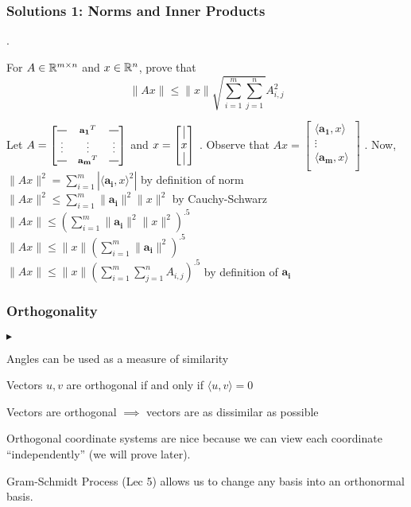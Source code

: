 \documentclass{beamer}
\renewenvironment{itemize}
\newcommand*{\horzbar}{\rule[.5ex]{2.5ex}{0.5pt}}
\newcommand\fonteight{\fontsize{8}{9.6}\selectfont}
\renewenvironment{enumerate}%
{\begin{list}{\arabic{enumi}.}%
      {\setlength{\leftmargin}{2.5em}%
       \setlength{\itemsep}{-\parsep}%
       \setlength{\topsep}{-\parskip}%
       \usecounter{enumi}}%
 }{\end{list}}
\renewenvironment{itemize}%
{\begin{list}{$\blacktriangleright$}%
      {\setlength{\leftmargin}{2.5em}%
       \setlength{\itemsep}{-\parsep}%
       \setlength{\topsep}{-\parskip}%
       \usecounter{enumi}}%
 }{\end{list}}
\begin{document}
\begin{frame}
\frametitle{Solutions 1: Norms and Inner Products}

\begin{enumerate}
\item[2.] For $A \in \mathbb{R}^{m\times n}$ and $x\in \mathbb{R}^n$, prove that
$$ \|Ax\| \leq \|x\|\sqrt{\sum_{i=1}^m \sum_{j=1}^n} A_{i,j}^2$$
\begin{solution}
Let $A = {\fonteight\begin{bmatrix}
			\horzbar    & \mathbf{a_1}^T    & \horzbar  \\
			\vdots    & \vdots & \vdots  \\
			\horzbar    & \mathbf{a_m}^T    & \horzbar   \\
		 \end{bmatrix}}$
	and
	$x =  \begin{bmatrix}
			\vline \\
			 x \\   
			\vline \\ 
		 \end{bmatrix}$ .
Observe that 
$Ax =  \begin{bmatrix}
			 \langle \mathbf{a_1},x \rangle \\
			 \vdots \\   
			\langle \mathbf{a_m},x \rangle \\ 
		 \end{bmatrix}$ .
Now,\\
\qquad $\|Ax\|^2 = \sum_{i=1}^m  |\langle \mathbf{a_i},x \rangle ^2|$ \qquad by definition of norm \\
\qquad $\|Ax\|^2 \leq \sum_{i=1}^m \|\mathbf{a_i}\|^2 \|x\|^2$ \qquad by Cauchy-Schwarz \\
\qquad $\|Ax\| \leq (\sum_{i=1}^m \|\mathbf{a_i}\|^2 \|x\|^2)^{.5}$\\
\qquad $\|Ax\| \leq \|x\|(\sum_{i=1}^m \|\mathbf{a_i}\|^2 )^{.5}$ \\
\qquad $\|Ax\| \leq \|x\|(\sum_{i=1}^m \sum_{j=1}^n A_{i,j})^{.5}$ \qquad by definition of $\mathbf{a_i}$

\end{solution}
\end{enumerate}
\end{frame}

\begin{frame}
\frametitle{Orthogonality}
\begin{itemize}
\item Angles can be used as a measure of similarity
\item Vectors $u,v$ are orthogonal if and only if $ \langle u,v \rangle =0$
\item Vectors are orthogonal $\implies$ vectors are as dissimilar as possible
\item Orthogonal coordinate systems are nice because we can view each coordinate ``independently'' (we will prove later).
\item Gram-Schmidt Process (Lec 5) allows us to change any basis into an orthonormal basis.
\end{itemize}
\end{frame}
\end{document}

